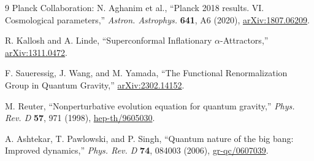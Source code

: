\documentclass[11pt,a4paper]{article}
\begin{document}
\begin{thebibliography}{9}
Planck Collaboration: N. Aghanim et al., ``Planck 2018 results. VI. Cosmological parameters,'' \textit{Astron. Astrophys.} \textbf{641}, A6 (2020), \href{https://arxiv.org/abs/1807.06209}{arXiv:1807.06209}.

R. Kallosh and A. Linde, ``Superconformal Inflationary $\alpha$-Attractors,'' \href{https://arxiv.org/abs/1311.0472}{arXiv:1311.0472}.

F. Saueressig, J. Wang, and M. Yamada, ``The Functional Renormalization Group in Quantum Gravity,'' \href{https://arxiv.org/abs/2302.14152}{arXiv:2302.14152}.

M. Reuter, ``Nonperturbative evolution equation for quantum gravity,'' \textit{Phys. Rev. D} \textbf{57}, 971 (1998), \href{https://arxiv.org/abs/hep-th/9605030}{hep-th/9605030}.

A. Ashtekar, T. Pawlowski, and P. Singh, ``Quantum nature of the big bang: Improved dynamics,'' \textit{Phys. Rev. D} \textbf{74}, 084003 (2006), \href{https://arxiv.org/abs/gr-qc/0607039}{gr-qc/0607039}.
\end{thebibliography}
\end{document}
